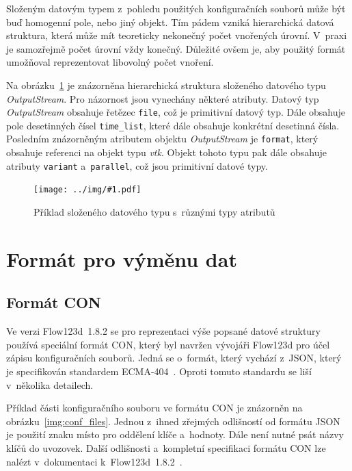 \documentclass[FM,bw,DP]{tulthesis}
\newcommand{\includeimg}[2]{%
\begin{figure}[h]
	\centering
    \texttt{[image: ../img/\#1.pdf]}
    \caption{#2}
	\label{img:#1}
\end{figure}
}
\begin{document}
Složeným datovým typem z~pohledu použitých konfiguračních souborů může být buď homogenní pole, nebo jiný objekt. Tím pádem vzniká hierarchická datová struktura, která může mít teoreticky nekonečný počet vnořených úrovní. V~praxi je samozřejmě počet úrovní vždy konečný. Důležité ovšem je, aby použitý formát umožňoval reprezentovat libovolný počet vnoření.

Na obrázku~\ref{img:data_tree} je znázorněna hierarchická struktura složeného datového typu \textit{OutputStream}. Pro názornost jsou vynechány některé atributy. Datový typ \textit{OutputStream} obsahuje řetězec \texttt{file}, což je primitivní datový typ. Dále obsahuje pole desetinných čísel \texttt{time\_list}, které dále obsahuje konkrétní desetinná čísla. Posledním znázorněným atributem objektu \textit{OutputStream} je \texttt{format}, který obsahuje referenci na objekt typu \textit{vtk}. Objekt tohoto typu pak dále obsahuje atributy \texttt{variant} a~\texttt{parallel}, což jsou primitivní datové typy.

\includeimg{data_tree}{Příklad složeného datového typu s~různými typy atributů}

\section{Formát pro výměnu dat}

\subsection{Formát CON}

Ve verzi Flow123d~1.8.2 se pro reprezentaci výše popsané datové struktury používá speciální formát \gls{CON}, který byl navržen vývojáři Flow123d pro účel zápisu konfiguračních souborů. Jedná se o~formát, který vychází z~\gls{JSON}, který je specifikován standardem ECMA-404~\cite{bib:ecma404}. Oproti tomuto standardu se liší v~několika detailech.

Příklad části konfiguračního souboru ve formátu \gls{CON} je znázorněn na obrázku~\ref{img:conf_files}. Jednou z~ihned zřejmých odlišností od formátu \gls{JSON} je použití znaku \uv{\texttt{=}} místo \uv{\texttt{:}} pro oddělení klíče a~hodnoty. Dále není nutné psát názvy klíčů do uvozovek. Další odlišnosti a~kompletní specifikaci formátu \gls{CON} lze nalézt v~dokumentaci k~Flow123d~1.8.2~\cite{bib:flow123d-manual}.
\end{document}
